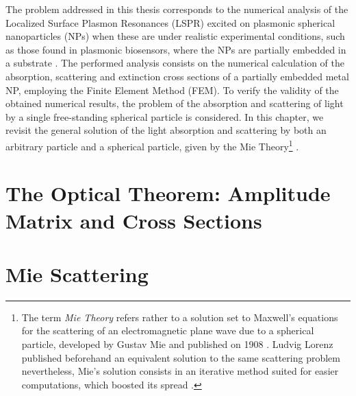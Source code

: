 \documentclass[11pt]{Latex/Classes/PhDthesisPSnPDF}
\begin{document}
  The problem addressed in this thesis corresponds to the numerical analysis of the Localized Surface Plasmon Resonances (LSPR)  excited on plasmonic spherical nanoparticles (NPs) when these are under realistic experimental conditions, such as those found in plasmonic biosensors, where the NPs are partially embedded in a substrate \cite{moirangthem_enhanced_2012}. The performed analysis consists on the numerical calculation of the absorption, scattering and extinction  cross sections of a partially embedded metal NP, employing the Finite Element Method (FEM). To verify the validity of the obtained numerical results, the problem of the absorption and scattering of light by a single free-standing spherical particle is considered. In this chapter, we revisit the general solution of the light absorption and scattering by both an arbitrary particle and a spherical particle, given by the Mie Theory\footnote{The term \emph{Mie Theory} refers rather to a solution set to Maxwell's equations for the scattering of an electromagnetic plane wave due to a spherical particle, developed by Gustav Mie and published on 1908 \cite{mie_beitrage_1908}. Ludvig Lorenz published beforehand an equivalent solution to the same scattering problem nevertheless, Mie's solution consists in an iterative method suited for easier computations, which boosted its spread \cite{horvath_gustav_2009}. } \cite{bohren_absorption_1983}.

	\section{The Optical Theorem: Amplitude Matrix and Cross Sections}
	 \label{s:AmpMatCrossSect}
	 

	\section{Mie Scattering}
	  \label{s:Mie}
\end{document}
